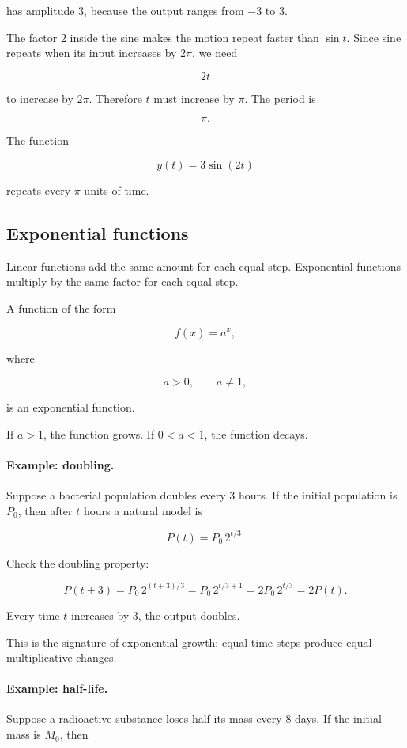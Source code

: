 has amplitude \(3\), because the output ranges from \(-3\) to \(3\).

The factor \(2\) inside the sine makes the motion repeat faster than \(\sin t\). Since sine repeats when its input increases by \(2\pi\), we need

\[
2t
\]

to increase by \(2\pi\). Therefore \(t\) must increase by \(\pi\). The period is

\[
\pi.
\]

The function

\[
y(t)=3\sin(2t)
\]

repeats every \(\pi\) units of time.

\subsection{Exponential functions}
\label{subsec:exponential-functions}

Linear functions add the same amount for each equal step. Exponential functions multiply by the same factor for each equal step.

A function of the form

\[
f(x)=a^x,
\]

where

\[
a>0,\qquad a\neq1,
\]

is an exponential function.

If \(a>1\), the function grows. If \(0<a<1\), the function decays.

\paragraph{Example: doubling.}
Suppose a bacterial population doubles every \(3\) hours. If the initial population is \(P_0\), then after \(t\) hours a natural model is

\[
P(t)=P_0\,2^{t/3}.
\]

Check the doubling property:

\[
P(t+3)
=
P_0\,2^{(t+3)/3}
=
P_0\,2^{t/3+1}
=
2P_0\,2^{t/3}
=
2P(t).
\]

Every time \(t\) increases by \(3\), the output doubles.

This is the signature of exponential growth: equal time steps produce equal multiplicative changes.

\paragraph{Example: half-life.}
Suppose a radioactive substance loses half its mass every \(8\) days. If the initial mass is \(M_0\), then

